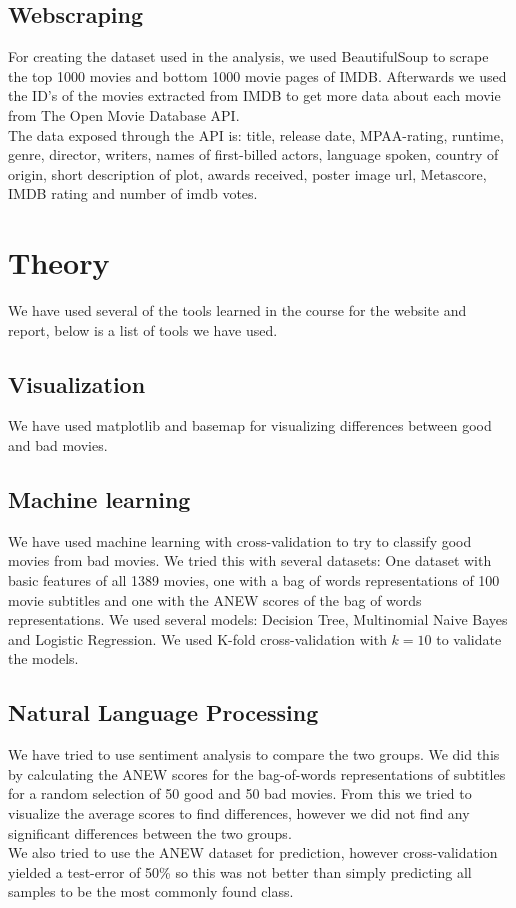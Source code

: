 \documentclass{acm_proc_article-sp}
\begin{document}
\subsection{Webscraping}
For creating the dataset used in the analysis, we used BeautifulSoup\cite{BS4} to scrape the top 1000 movies and bottom 1000 movie pages of IMDB\cite{IMDB}. Afterwards we used the ID's of the movies extracted from IMDB to get more data about each movie from The Open Movie Database API\cite{OMDB}.\\ The data exposed through the API is: title, release date, MPAA-rating, runtime, genre, director, writers, names of first-billed actors, language spoken, country of origin, short description of plot, awards received, poster image url, Metascore, IMDB rating and number of imdb votes.

\section{Theory}
We have used several of the tools learned in the course for the website and report, below is a list of tools we have used.
\subsection{Visualization}
We have used matplotlib and basemap for visualizing differences between good and bad movies. 
\subsection{Machine learning}
We have used machine learning with cross-validation to try to classify good movies from bad movies. We tried this with several datasets: One dataset with basic features of all 1389 movies, one with a bag of words representations of 100 movie subtitles and one with the ANEW scores of the bag of words representations. We used several models: Decision Tree, Multinomial Naive Bayes and Logistic Regression. We used K-fold cross-validation with $k=10$ to validate the models.

\subsection{Natural Language Processing}
We have tried to use sentiment analysis to compare the two groups. We did this by calculating the ANEW scores\cite{anew} for the bag-of-words representations of subtitles for a random selection of 50 good and 50 bad movies. From this we tried to visualize the average scores to find differences, however we did not find any significant differences between the two groups.\\
We also tried to use the ANEW dataset for prediction, however cross-validation yielded a test-error of 50\% so this was not better than simply predicting all samples to be the most commonly found class. \\
\end{document}
